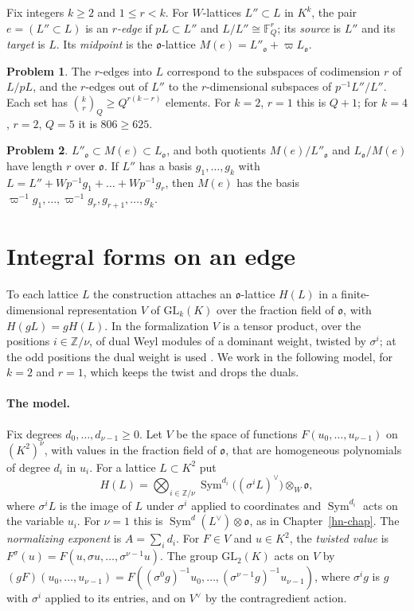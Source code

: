 \documentclass[reqno]{amsart}
\newcounter{chap}
\theoremstyle{definition}
\newtheorem{problem}{Problem}[section]
\theoremstyle{plain}
\theoremstyle{remark}
\newcommand{\Z}{\mathbb Z}
\newcommand{\F}{\mathbb F}
\newcommand{\GL}{\mathrm{GL}}
\newcommand{\Sym}{\operatorname{Sym}}
\newcommand{\vo}{\mathfrak o}
\begin{document}
Fix integers \(k\ge2\) and \(1\le r<k\).  For \(W\)-lattices \(L''\subset L\) in \(K^k\), the pair \(e=(L''\subset L)\) is an \emph{\(r\)-edge} if \(pL\subset L''\) and \(L/L''\cong\F_Q^r\); its \emph{source} is \(L''\) and its \emph{target} is \(L\).  Its \emph{midpoint} is the \(\vo\)-lattice \(M(e)=L''_\vo+\varpi L_\vo\).

\begin{problem}\label{pr:count}
The \(r\)-edges into \(L\) correspond to the subspaces of codimension \(r\) of \(L/pL\), and the \(r\)-edges out of \(L''\) to the \(r\)-dimensional subspaces of \(p^{-1}L''/L''\).  Each set has \(\binom kr_Q\ge Q^{r(k-r)}\) elements.  For \(k=2\), \(r=1\) this is \(Q+1\); for \(k=4\), \(r=2\), \(Q=5\) it is \(806\ge625\).
\end{problem}

\begin{problem}\label{pr:midpoint}
\(L''_\vo\subset M(e)\subset L_\vo\), and both quotients \(M(e)/L''_\vo\) and \(L_\vo/M(e)\) have length \(r\) over \(\vo\).  If \(L''\) has a basis \(g_1,\dots,g_k\) with \(L=L''+W p^{-1}g_1+\dots+Wp^{-1}g_r\), then \(M(e)\) has the basis \(\varpi^{-1}g_1,\dots,\varpi^{-1}g_r,g_{r+1},\dots,g_k\).
\end{problem}

\section{Integral forms on an edge}\label{sec:forms}

To each lattice \(L\) the construction attaches an \(\vo\)-lattice \(H(L)\) in a finite-dimensional representation \(V\) of \(\GL_k(K)\) over the fraction field of \(\vo\), with \(H(gL)=gH(L)\).  In the formalization \(V\) is a tensor product, over the positions \(i\in\Z/\nu\), of dual Weyl modules of a dominant weight, twisted by \(\sigma^i\); at the odd positions the dual weight is used \cite{Lean}.  We work in the following model, for \(k=2\) and \(r=1\), which keeps the twist and drops the duals.

\paragraph{The model.}  Fix degrees \(d_0,\dots,d_{\nu-1}\ge0\).  Let \(V\) be the space of functions \(F(u_0,\dots,u_{\nu-1})\) on \((K^2)^\nu\), with values in the fraction field of \(\vo\), that are homogeneous polynomials of degree \(d_i\) in \(u_i\).  For a lattice \(L\subset K^2\) put
\[
 H(L)=\bigotimes_{i\in\Z/\nu}\Sym^{d_i}\bigl((\sigma^iL)^\vee\bigr)\otimes_W\vo ,
\]
where \(\sigma^iL\) is the image of \(L\) under \(\sigma^i\) applied to coordinates and \(\Sym^{d_i}\) acts on the variable \(u_i\).  For \(\nu=1\) this is \(\Sym^d(L^\vee)\otimes\vo\), as in Chapter~\ref{hn-chap}.  The \emph{normalizing exponent} is \(A=\sum_id_i\).  For \(F\in V\) and \(u\in K^2\), the \emph{twisted value} is \(F^\sigma(u)=F(u,\sigma u,\dots,\sigma^{\nu-1}u)\).  The group \(\GL_2(K)\) acts on \(V\) by \((gF)(u_0,\dots,u_{\nu-1})=F((\sigma^0g)^{-1}u_0,\dots,(\sigma^{\nu-1}g)^{-1}u_{\nu-1})\), where \(\sigma^ig\) is \(g\) with \(\sigma^i\) applied to its entries, and on \(V^\vee\) by the contragredient action.
\end{document}
